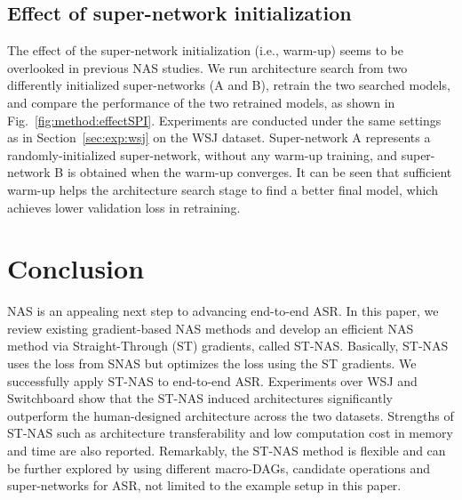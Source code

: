 \documentclass{article}
\newcommand{\figref}{Fig.~\ref}
\newcommand{\secref}{Section~\ref}
\begin{document}
\vspace{-2mm}
\subsection{Effect of super-network initialization}
\label{sec:method:effectSI}
\vspace{-1mm}
The effect of the super-network initialization (i.e., warm-up) seems to be overlooked in previous NAS studies.
We run architecture search from two differently initialized super-networks (A and B), retrain the two searched models, and compare the performance of the two retrained models, as shown in \figref{fig:method:effectSPI}.
Experiments are conducted under the same settings as in \secref{sec:exp:wsj} on the WSJ dataset.
Super-network A represents a randomly-initialized super-network, without any warm-up training, and super-network B is obtained when the warm-up converges.
It can be seen that sufficient warm-up helps the architecture search stage to find a better final model, which achieves lower validation loss in retraining.



\section{Conclusion}
\label{sec:conclusion}
NAS is an appealing next step to advancing end-to-end ASR.
In this paper, we review existing gradient-based NAS methods and develop an efficient NAS method via Straight-Through (ST) gradients, called ST-NAS.
Basically, ST-NAS uses the loss from SNAS but optimizes the loss using the ST gradients.
We successfully apply ST-NAS to end-to-end ASR.
Experiments over WSJ and Switchboard show that the ST-NAS induced architectures significantly outperform the human-designed architecture across the two datasets. Strengths of ST-NAS such as architecture transferability and low computation cost in memory and time are also reported.
Remarkably, the ST-NAS method is flexible and can be further explored by using different macro-DAGs, candidate operations and super-networks for ASR, not limited to the example setup in this paper.



\end{document}
